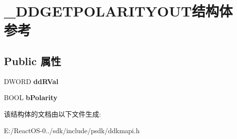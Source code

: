 \hypertarget{struct___d_d_g_e_t_p_o_l_a_r_i_t_y_o_u_t}{}\section{\+\_\+\+D\+D\+G\+E\+T\+P\+O\+L\+A\+R\+I\+T\+Y\+O\+U\+T结构体 参考}
\label{struct___d_d_g_e_t_p_o_l_a_r_i_t_y_o_u_t}
\subsection*{Public 属性}
\begin{DoxyCompactItemize}
\item 
\mbox{\label{struct___d_d_g_e_t_p_o_l_a_r_i_t_y_o_u_t_a71ef98b2588957bcb8a7db8a35e38256}} 
D\+W\+O\+RD {\bfseries dd\+R\+Val}
\item 
\mbox{\label{struct___d_d_g_e_t_p_o_l_a_r_i_t_y_o_u_t_ad562993ad22c6c8fc74bdf65275639be}} 
B\+O\+OL {\bfseries b\+Polarity}
\end{DoxyCompactItemize}


该结构体的文档由以下文件生成\+:\begin{DoxyCompactItemize}
\item 
E\+:/\+React\+O\+S-\/0../sdk/include/psdk/ddkmapi.\+h\end{DoxyCompactItemize}
